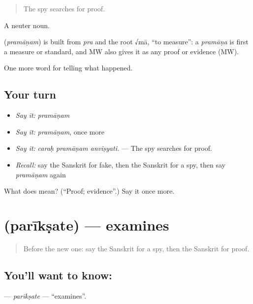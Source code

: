 \begin{quote}
The spy searches for proof.
\end{quote}

A neuter noun.

\begin{cousinweb}
\textbf{} (\emph{pramāṇam}) is built from \emph{pra} and the root √mā, \textquotedblleft{}to measure\textquotedblright{}: a \emph{pramāṇa} is first a measure or standard, and MW also gives it as any proof or evidence (MW).
\end{cousinweb}

\begin{grammarlens}[title={What you've built}]
One more word for telling what happened.
\end{grammarlens}

\subsection*{Your turn}
\begin{itemize}
\raggedright
  \item \emph{Say it:} \emph{pramāṇam}
  \item \emph{Say it:} \emph{pramāṇam}, once more
  \item \emph{Say it:} \emph{caraḥ pramāṇam anviṣyati.} — The spy searches for proof.
  \item \emph{Recall:} say the Sanskrit for fake, then the Sanskrit for a spy, then say \emph{pramāṇam} again
\end{itemize}

\begin{tcolorbox}[breakable,colback=teal!4,colframe=teal!35!black,title={Before you move on}]
What does  mean? (\textquotedblleft{}Proof; evidence\textquotedblright{}.) Say it once more.
\end{tcolorbox}
\section[\texorpdfstring{\sk{परीक्षते} (parīkṣate)}{परीक्षते (parīkṣate)}]{ (parīkṣate) — examines}

\label{lesson:SA-C292-pariksate}



\begin{quote}
Before the new one: say the Sanskrit for a spy, then the Sanskrit for proof.
\end{quote}

\subsection*{You'll want to know: }
\textbf{} — \emph{parīkṣate} — \textquotedblleft{}examines\textquotedblright{}.

